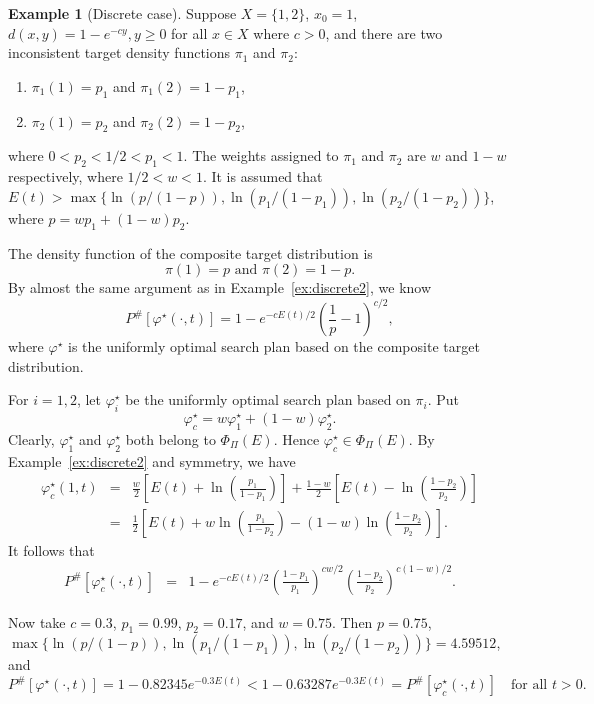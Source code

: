 \documentclass[12pt]{article}
\theoremstyle{plain}
\theoremstyle{definition}
\newtheorem{example}{Example}%
\theoremstyle{remark}
\begin{document}
\begin{example}[Discrete case]
\label{ex:discrete4}
Suppose $X=\{1, 2\}$, $x_0=1$, $d(x, y)=1-e^{-cy}, y\geq 0$ for all $x\in X$ where $c>0$,  and there are two inconsistent target density functions $\pi_1$ and $\pi_2$: 
\begin{enumerate}
\item[]$\pi_1(1)=p_1$ and $\pi_1(2)=1-p_1$,
\item[]$\pi_2(1)=p_2$ and $\pi_2(2)=1-p_2$,
\end{enumerate}
where $0<p_2<1/2<p_1<1$.  The weights assigned to $\pi_1$  and $\pi_2$ are $w$ and $1-w$ respectively, where $1/2<w<1$.  It is assumed that $E(t)>\max\{\ln(p/(1-p)), \ln(p_1/(1-p_1)), \ln(p_2/(1-p_2))\}$, where $p=wp_1+(1-w)p_2$. 

The density function of the composite target distribution is
\[
\pi(1)=p \text{ and $\pi(2)=1-p$}.
\]
By almost the same argument as in Example~\ref{ex:discrete2}, we know  
\[
P^{\#}[\varphi^\star(\cdot, t)]=1-e^{-cE(t)/2}\left(\frac{1}{p}-1\right)^{c/2},
\]
where $\varphi^\star$ is the uniformly optimal search plan based on the composite target distribution.

For $i=1, 2$, let $\varphi_i^\star$ be the uniformly optimal search plan based on $\pi_i$.  Put 
\[
\varphi^\star_c=w\varphi^\star_1 +(1-w)\varphi^\star_2.
\]
Clearly, $\varphi_1^\star$ and $\varphi_2^\star$ both belong to $\Phi_{\Pi}(E)$.  Hence $\varphi^\star_c\in \Phi_{\Pi}(E)$.  By Example~\ref{ex:discrete2} and symmetry, we have 
\begin{eqnarray*}
\varphi_c^\star(1, t) &=& \frac{w}{2}\left[E(t)+\ln\left(\frac{p_1}{1-p_1}\right)\right]+\frac{1-w}{2}\left[E(t)-\ln\left(\frac{1-p_2}{p_2}\right)\right] \\
&=& \frac{1}{2}\left[E(t)+w\ln\left(\frac{p_1}{1-p_2}\right)-(1-w)\ln\left(\frac{1-p_2}{p_2}\right)\right].
\end{eqnarray*}
It follows that
\begin{eqnarray*}
P^{\#}[\varphi_c^\star(\cdot, t)] 
&=& 1-e^{-cE(t)/2}\left(\frac{1-p_1}{p_1}\right)^{cw/2}\left(\frac{1-p_2}{p_2}\right)^{c(1-w)/2}.
\end{eqnarray*}



Now take $c=0.3$, $p_1=0.99$, $p_2=0.17$, and $w=0.75$. Then $p=0.75$, $\max\{\ln(p/(1-p)), \ln(p_1/(1-p_1)), \ln(p_2/(1-p_2))\}=4.59512$, and
\[
P^{\#}[\varphi^\star(\cdot, t)]=1-0.82345e^{-0.3 E(t)} < 1-0.63287 e^{-0.3 E(t)}=P^{\#}[\varphi_c^\star(\cdot, t)]\quad \text{for all $t>0$.}
\]


\end{example}
\end{document}
